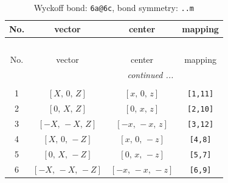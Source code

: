 \documentclass[fleqn,8pt]{jsarticle}
\begin{document}
\begin{longtable}{cccc}
\caption{Wyckoff bond: {\tt 6a@6c}, bond symmetry: {\tt ..m}}
 \\
 \hline \hline
No. & vector & center & mapping \\ \hline \endfirsthead

\multicolumn{3}{l}{\tablename\ \thetable{}} \\
 \hline \hline
No. & vector & center & mapping \\ \hline \endhead

 \hline \hline
\multicolumn{3}{r}{\footnotesize\it continued ...} \\ \endfoot

 \hline \hline
\multicolumn{3}{r}{} \\ \endlastfoot

1 & $\left[ X,\, 0,\, Z \right]$ & $\left[ x,\, 0,\, z \right]$ & {\tt [1,11]} \\ \hline
2 & $\left[ 0,\, X,\, Z \right]$ & $\left[ 0,\, x,\, z \right]$ & {\tt [2,10]} \\ \hline
3 & $\left[ - X,\, - X,\, Z \right]$ & $\left[ - x,\, - x,\, z \right]$ & {\tt [3,12]} \\ \hline
4 & $\left[ X,\, 0,\, - Z \right]$ & $\left[ x,\, 0,\, - z \right]$ & {\tt [4,8]} \\ \hline
5 & $\left[ 0,\, X,\, - Z \right]$ & $\left[ 0,\, x,\, - z \right]$ & {\tt [5,7]} \\ \hline
6 & $\left[ - X,\, - X,\, - Z \right]$ & $\left[ - x,\, - x,\, - z \right]$ & {\tt [6,9]} \\
\end{longtable}
\renewcommand{\arraystretch}{1.2}
\end{document}
